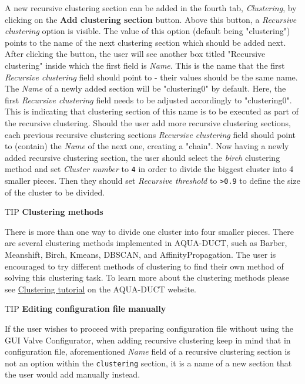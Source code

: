 \documentclass[9pt,tutorial]{livecoms}
\begin{document}
A new recursive clustering section can be added in the fourth tab, \textit{Clustering}, by clicking on the \textbf{Add clustering section} button. Above this button, a \textit{Recursive clustering} option is visible. The value of this option (default being "clustering") points to the name of the next clustering section which should be added next. After clicking the button, the user will see another box titled "Recursive clustering" inside which the first field is \textit{Name}. This is the name that the first \textit{Recursive clustering} field should point to - their values should be the same name. The \textit{Name} of a newly added section will be "clustering0" by default. Here, the first \textit{Recursive clustering} field needs to be adjusted accordingly to "clustering0". This is indicating that clustering section of this name is to be executed as part of the recursive clustering. Should the user add more recursive clustering sections, each previous recursive clustering sections \textit{Recursive clustering} field should point to (contain) the \textit{Name} of the next one, creating a "chain". Now having a newly added recursive clustering section, the user should select the \emph{birch} clustering method and set \emph{Cluster number} to \texttt{4} in order to divide the biggest cluster into 4 smaller pieces. Then they should set \emph{Recursive threshold} to \texttt{>0.9} to define the size of the cluster to be divided.

\begin{Checklists}
\begin{checklist}{TIP}
\textbf{Clustering methods}

There is more than one way to divide one cluster into four smaller pieces. There are several clustering methods implemented in AQUA-DUCT, such as Barber, Meanshift, Birch, Kmeans, DBSCAN, and AffinityPropagation. The user is encouraged to try different methods of clustering to find their own method of solving this clustering task. To learn more about the clustering methods please see \href{http://www.aquaduct.pl/clustering/}{Clustering tutorial} on the AQUA-DUCT website.
\end{checklist}
\end{Checklists}

\begin{Checklists}
\begin{checklist}{TIP}
\textbf{Editing configuration file manually}

If the user wishes to proceed with preparing configuration file without using the GUI Valve Configurator, when adding recursive clustering keep in mind that in configuration file, aforementioned \textit{Name} field of a recursive clustering section is not an option within the \texttt{clustering} section, it is a name of a new section that the user would add manually instead.
\end{checklist}
\end{Checklists}
\end{document}

